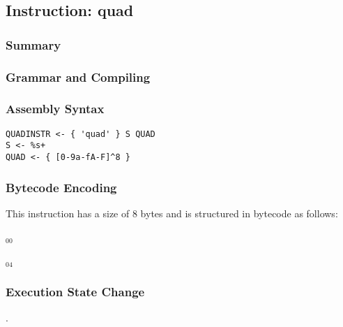 \subsection{Instruction: quad}

\subsubsection{Summary}


\subsubsection{Grammar and Compiling}


\subsubsection{Assembly Syntax}

\begin{myquote}
\begin{verbatim}
QUADINSTR <- { 'quad' } S QUAD
S <- %s+
QUAD <- { [0-9a-fA-F]^8 }
\end{verbatim}
\end{myquote}

\subsubsection{Bytecode Encoding}

This instruction has a size of 8 bytes and is structured in bytecode as follows:

$_{00}$\ 



$_{04}$\ 


\subsubsection{Execution State Change}

.


